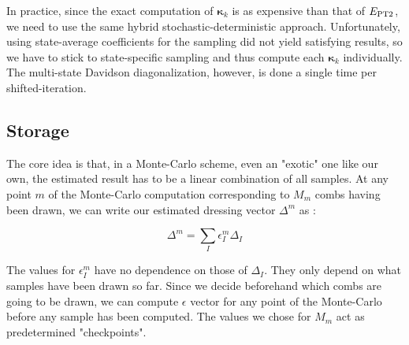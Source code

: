 \documentclass[./thesis.tex]{subfiles}
\begin{document}
In practice, since the exact computation of ${\pmb \kappa}_k$ is as expensive than that of $E_\text{PT2}$, we need to use the same hybrid stochastic-deterministic approach. Unfortunately, using state-average coefficients for the sampling did not yield satisfying results, so we have to stick to state-specific sampling and thus compute each ${\pmb \kappa}_k$ individually. The multi-state Davidson diagonalization, however, is done a single time per shifted-\Bk iteration.


\subsection{Storage}

The core idea is that, in a Monte-Carlo scheme, even an "exotic" one like our own, the estimated result has to be a linear combination of all samples. At any point $m$ of the Monte-Carlo computation corresponding to $M_m$ combs having been drawn, we can write our estimated dressing vector $\Delta^m$ as :


\begin{equation}
\Delta^m = \sum_{I} \epsilon^m_{I} \Delta_I
\end{equation}


The values for $\epsilon^m_I$ have no dependence on those of $\Delta_I$. They only depend on what samples have been drawn so far. Since we decide beforehand which combs are going to be drawn, we can compute $\epsilon$ vector for any point of the Monte-Carlo before any sample has been computed. The values we chose for $M_m$ act as predetermined "checkpoints".

\end{document}
